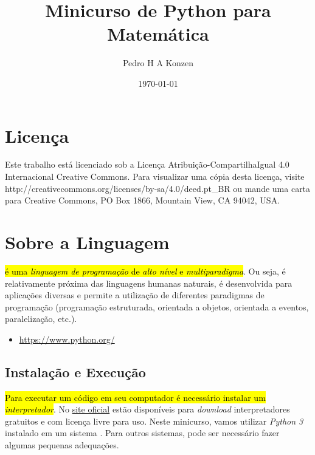 \documentclass[12pt]{article}
\begin{document}
\title{Minicurso de Python para Matemática}
\author{Pedro H A Konzen}
\date{\today}

\maketitle

\tableofcontents

\section{Licença}\label{sec_licenca}

Este trabalho está licenciado sob a Licença Atribuição-CompartilhaIgual 4.0 Internacional Creative Commons. Para visualizar uma cópia desta licença, visite http://creativecommons.org/licenses/by-sa/4.0/deed.pt\_BR ou mande uma carta para Creative Commons, PO Box 1866, Mountain View, CA 94042, USA.


\section{Sobre a Linguagem}\label{sec_sobrepy}

\hl{{\python} é uma \emph{linguagem de programação} de \emph{alto nível} e \emph{multiparadigma}}. Ou seja, é relativamente próxima das linguagens humanas naturais, é desenvolvida para aplicações diversas e permite a utilização de diferentes paradigmas de programação (programação estruturada, orientada a objetos, orientada a eventos, paralelização, etc.).

\begin{itemize}
\item {}
  \begin{center}
    \href{https://www.python.org/}{https://www.python.org/}
  \end{center}
\end{itemize}

\subsection{Instalação e Execução}

\hl{Para executar um código {\python} em seu computador é necessário instalar um \emph{interpretador}}. No \href{https://www.python.org/}{site oficial} estão disponíveis para \textit{download} interpretadores gratuitos e com licença livre para uso. Neste minicurso, vamos utilizar \emph{Python 3} instalado em um sistema {\linux}. Para outros sistemas, pode ser necessário fazer algumas pequenas adequações.
\end{document}
